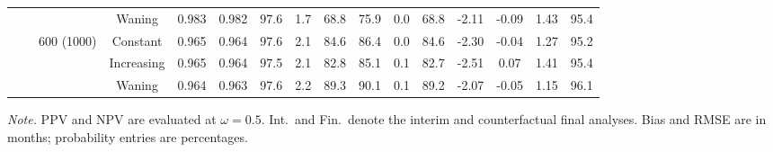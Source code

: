 \begin{table}[!htbp]
{\begin{tabular}[t]{cccccccccccccccc}
 &  &  & Waning & 0.983 & 0.982 & 97.6 & 1.7 & 68.8 & 75.9 & 0.0 & 68.8 & -2.11 & -0.09 & 1.43 & 95.4\\
\cmidrule(l{3pt}r{3pt}){3-3} \cmidrule(l{3pt}r{3pt}){4-4} \cmidrule(l{3pt}r{3pt}){5-6} \cmidrule(l{3pt}r{3pt}){7-10} \cmidrule(l{3pt}r{3pt}){11-12} \cmidrule(l{3pt}r{3pt}){13-16}
 &  & 600 (1000) & Constant & 0.965 & 0.964 & 97.6 & 2.1 & 84.6 & 86.4 & 0.0 & 84.6 & -2.30 & -0.04 & 1.27 & 95.2\\
 &  &  & Increasing & 0.965 & 0.964 & 97.5 & 2.1 & 82.8 & 85.1 & 0.1 & 82.7 & -2.51 & 0.07 & 1.41 & 95.4\\
 &  &  & Waning & 0.964 & 0.963 & 97.6 & 2.2 & 89.3 & 90.1 & 0.1 & 89.2 & -2.07 & -0.05 & 1.15 & 96.1\\
\bottomrule
\end{tabular}}
\par\vspace{2pt}
\begin{minipage}{\linewidth}
\footnotesize\raggedright
\textit{Note.} PPV and NPV are evaluated at $\omega=0.5$. Int.\ and Fin.\ denote the interim and counterfactual final analyses. Bias and RMSE are in months; probability entries are percentages.
\end{minipage}
\end{table}
